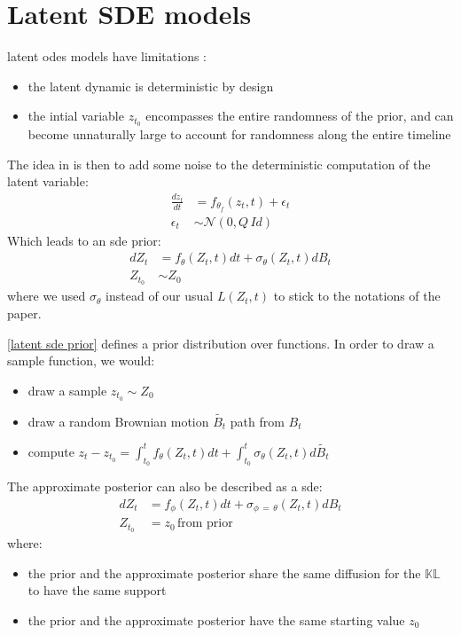 \section{Latent SDE models}

\glspl{latent ode} models have limitations :
\begin{itemize}
    \item the latent dynamic is deterministic by design
    \item the intial variable $z_{t_0}$ encompasses the entire randomness of the prior, and can become
    unnaturally large to account for randomness along the entire timeline
\end{itemize}

The idea in \cite{li_scalable_2020} is then to add some noise to the deterministic computation of the latent variable:
\begin{align}
    \frac{dz_t}{dt} &= f_{\theta_f}(z_t,t) + \epsilon_t \\
    \epsilon_t &\sim \mathcal{N}(0,Q \, \textit{Id})
\end{align}
Which leads to an \gls{sde} prior:
\begin{align}
    \label{latent sde prior}
    dZ_t &= f_{\theta}(Z_t, t)dt + \sigma_{\theta}(Z_t,t)dB_t \\
    Z_{t_0} &\sim Z_0
\end{align}
where we used $\sigma_{\theta}$ instead of our usual $L(Z_t,t)$ to stick to the notations of the paper.

\ref{latent sde prior} defines a prior distribution over functions. In order to draw a sample function, we would:
\begin{itemize}
    \item draw a sample $z_{t_0} \sim Z_0$
    \item draw a random Brownian motion $\tilde{B_t}$ path from $B_t$
    \item compute $z_t - z_{t_0} = \int_{t_0}^{t} f_{\theta}(Z_t, t)dt + \int_{t_0}^{t} \sigma_{\theta}(Z_t,t)d\tilde{B_t}$
\end{itemize}

The approximate posterior can also be described as a \gls{sde}:
\begin{align}
    dZ_t &= f_{\phi}(Z_t,t)dt + \sigma_{\phi \, = \, \theta}(Z_t,t)dB_t \\
    Z_{t_0} &= z_0 \, \text{from prior}
\end{align}
where:
\begin{itemize}
    \item the prior and the approximate posterior share the same diffusion for the $\mathbb{KL}$ to have the same support
    \item the prior and the approximate posterior have the same starting value $z_0$
\end{itemize}

